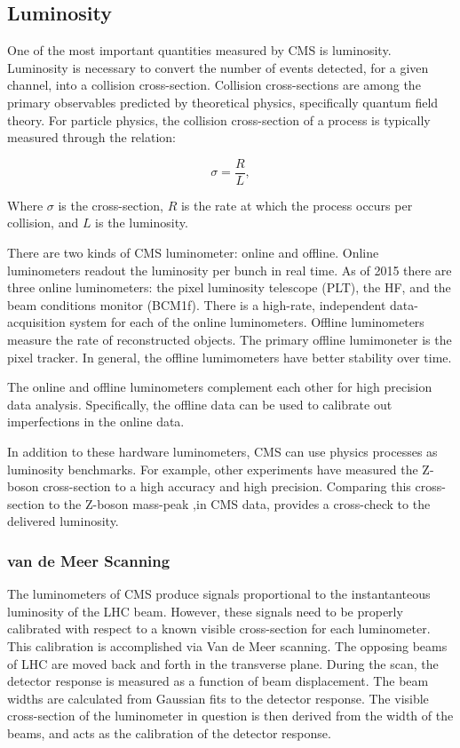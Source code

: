 \subsection{Luminosity}

One of the most important quantities measured by CMS is luminosity. Luminosity is necessary to convert the number of events detected, for a given channel, into a collision cross-section. Collision cross-sections are among the primary observables predicted by theoretical physics, specifically quantum field theory. For particle physics, the collision cross-section of a process is typically measured through the relation:

\begin{equation}
\sigma  = \frac{R}{\mathit{L}} ,
\end{equation}

Where $\sigma$ is the cross-section, $R$ is the rate at which the process occurs per collision, and $L$ is the luminosity.

There are two kinds of CMS luminometer: online and offline. Online luminometers readout the luminosity per bunch in real time. As of 2015 there are three online luminometers: the pixel luminosity telescope (PLT), the HF, and the beam conditions monitor (BCM1f). There is a high-rate, independent data-acquisition system for each of the online luminometers. Offline luminometers measure the rate of reconstructed objects. The primary offline lumimoneter is the pixel tracker. In general, the offline lumimometers have better stability over time. \cite{CMS:2010gua}

The online and offline luminometers complement each other for high precision data analysis. Specifically, the offline data can be used to calibrate out imperfections in the online data. 

In addition to these hardware luminometers, CMS can use physics processes as luminosity benchmarks.  For example, other experiments have measured the Z-boson cross-section to a high accuracy and high precision. Comparing this cross-section to the Z-boson mass-peak ,in CMS data, provides a cross-check to the delivered luminosity. 

\subsubsection{van de Meer Scanning}

The luminometers of CMS produce signals proportional to the instantanteous luminosity of the LHC beam. However, these signals need to be properly calibrated with respect to a known visible cross-section for each luminometer. This calibration is accomplished via Van de Meer scanning. The opposing beams of LHC are moved back and forth in the transverse plane. During the scan, the detector response is measured as a function of beam displacement. The beam widths are calculated from Gaussian fits to the detector response. The visible cross-section of the luminometer in question is then derived from the width of the beams, and acts as the calibration of the detector response. 

